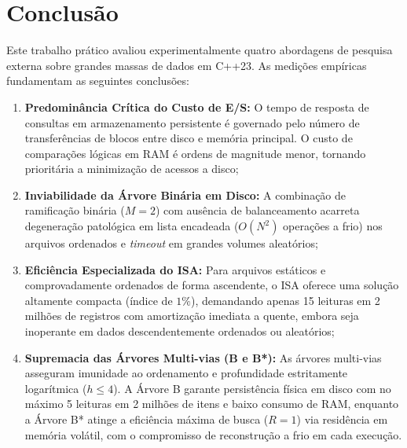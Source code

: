 \documentclass[12pt,a4paper]{article}
\begin{document}
\section{Conclusão}
\label{sec:conclusao}

Este trabalho prático avaliou experimentalmente quatro abordagens de pesquisa externa sobre grandes massas de dados em C++23. As medições empíricas fundamentam as seguintes conclusões:
\begin{enumerate}
    \item \textbf{Predominância Crítica do Custo de E/S:} O tempo de resposta de consultas em armazenamento persistente é governado pelo número de transferências de blocos entre disco e memória principal. O custo de comparações lógicas em RAM é ordens de magnitude menor, tornando prioritária a minimização de acessos a disco;
    \item \textbf{Inviabilidade da Árvore Binária em Disco:} A combinação de ramificação binária ($M=2$) com ausência de balanceamento acarreta degeneração patológica em lista encadeada ($O(N^2)$ operações a frio) nos arquivos ordenados e \textit{timeout} em grandes volumes aleatórios;
    \item \textbf{Eficiência Especializada do ISA:} Para arquivos estáticos e comprovadamente ordenados de forma ascendente, o ISA oferece uma solução altamente compacta (índice de $1\%$), demandando apenas 15 leituras em 2 milhões de registros com amortização imediata a quente, embora seja inoperante em dados descendentemente ordenados ou aleatórios;
    \item \textbf{Supremacia das Árvores Multi-vias (B e B*):} As árvores multi-vias asseguram imunidade ao ordenamento e profundidade estritamente logarítmica ($h \le 4$). A Árvore B garante persistência física em disco com no máximo 5 leituras em 2 milhões de itens e baixo consumo de RAM, enquanto a Árvore B* atinge a eficiência máxima de busca ($R = 1$) via residência em memória volátil, com o compromisso de reconstrução a frio em cada execução.
\end{enumerate}
\end{document}
